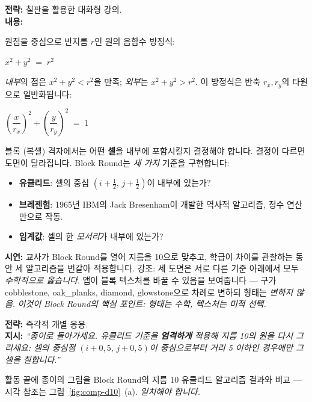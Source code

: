 \documentclass[12pt,a4paper]{scrartcl}
\newcommand{\acc}[1]{\textcolor{accent}{\textbf{#1}}}
\newcommand{\tempo}[1]{\textnormal{\footnotesize\color{bg!90!white}\textsf{#1}}}
\begin{document}
\begin{hwaldong}[1.3 --- 개념 정리 \quad\tempo{15분}]
\textbf{전략:} 칠판을 활용한 대화형 강의. \\[0.4em]
\textbf{내용:}

원점을 중심으로 반지름 $r$인 원의 음함수 방정식:

\begin{susik}
\centering
$\displaystyle x^2 + y^2 \;=\; r^2$
\end{susik}

\emph{내부}의 점은 $x^2 + y^2 < r^2$을 만족; \emph{외부}는 $x^2 + y^2 > r^2$. 이 방정식은 반축 $r_x, r_y$의 타원으로 일반화됩니다:

\begin{susik}
\centering
$\displaystyle \left(\dfrac{x}{r_x}\right)^{\!2} + \left(\dfrac{y}{r_y}\right)^{\!2} \;=\; 1$
\end{susik}

블록 (복셀) 격자에서는 어떤 \acc{셀}을 내부에 포함시킬지 결정해야 합니다. 결정이 다르면 도면이 달라집니다. Block Round는 \emph{세 가지} 기준을 구현합니다:

\begin{itemize}[leftmargin=1.3em,itemsep=0.15em,topsep=0.3em]
  \item \acc{유클리드}: 셀의 중심 $(i + \tfrac{1}{2},\, j + \tfrac{1}{2})$이 내부에 있는가?
  \item \acc{브레젠험}: 1965년 IBM의 Jack Bresenham이 개발한 역사적 알고리즘, 정수 연산만으로 작동.
  \item \acc{임계값}: 셀의 한 \emph{모서리}가 내부에 있는가?
\end{itemize}

\textbf{시연:} 교사가 Block Round를 열어 지름을 10으로 맞추고, 학급이 차이를 관찰하는 동안 세 알고리즘을 번갈아 적용합니다. 강조: 세 도면은 서로 다른 기준 아래에서 모두 \emph{수학적으로 옳습니다}. 앱이 블록 텍스처를 바꿀 수 있음을 보여줍니다 --- 구가 cobblestone, oak\_planks, diamond, glowstone으로 차례로 변하되 형태는 \emph{변하지 않음}. \emph{이것이 Block Round의 핵심 포인트: 형태는 수학, 텍스처는 미적 선택.}
\end{hwaldong}

\begin{hwaldong}[1.4 --- 종합 \quad\tempo{10분}]
\textbf{전략:} 즉각적 개별 응용. \\[0.4em]
\textbf{지시:} \emph{\enquote{종이로 돌아가세요. 유클리드 기준을 \acc{엄격하게} 적용해 지름 10의 원을 다시 그리세요: 셀의 중심점 $(i + 0{,}5,\, j + 0{,}5)$이 중심으로부터 거리 5 이하인 경우에만 그 셀을 칠합니다.}}

활동 끝에 종이의 그림을 Block Round의 지름 10 유클리드 알고리즘 결과와 비교 --- 시각 참조는 그림~\ref{fig:comp-d10}~(a). \emph{일치해야 합니다.}
\end{hwaldong}
\end{document}
